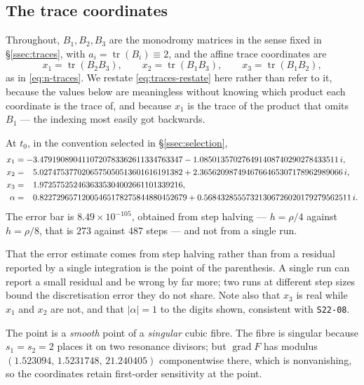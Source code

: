 \subsection{The trace coordinates}\label{ssec:traces-value}

Throughout, $B_1,B_2,B_3$ are the monodromy matrices in the sense fixed in
\S\ref{ssec:traces}, with $a_i=\operatorname{tr}(B_i)\equiv 2$, and the affine
trace coordinates are
\begin{equation}\label{eq:traces-restate}
x_1=\operatorname{tr}(B_2B_3),\qquad
x_2=\operatorname{tr}(B_1B_3),\qquad
x_3=\operatorname{tr}(B_1B_2),
\end{equation}
as in \eqref{eq:n-traces}. We restate \eqref{eq:traces-restate} here rather
than refer to it, because the values below are meaningless without knowing
which product each coordinate is the trace of, and because $x_1$ is the trace
of the product that omits $B_1$ --- the indexing most easily got backwards.

\begin{remark}
At $t_0$, in the convention selected in \S\ref{ssec:selection},
\begin{align*}
x_1&=-3.4791908904110720783362611334763347
 -1.085013570276491408740290278433511\,i,\\
x_2&=\hphantom{-}5.0274753770206575050513601616191382
 +2.3656209874946766465307178962989066\,i,\\
x_3&=\hphantom{-}1.9725752524636335304002661101339216,\\
\alpha&=\hphantom{-}0.82272965712005465178275844880452679
 +0.56843285557321306726020179279562511\,i.
\end{align*}
The error bar is $8.49\times10^{-105}$, obtained from step halving --- $h=\rho/4$
against $h=\rho/8$, that is $273$ against $487$ steps --- and not from a single
run.
\end{remark}

That the error estimate comes from step halving rather than from a residual
reported by a single integration is the point of the parenthesis. A single run
can report a small residual and be wrong by far more; two runs at different
step sizes bound the discretisation error they do not share. Note also that
$x_3$ is real while $x_1$ and $x_2$ are not, and that
$|\alpha|=1$ to the digits shown, consistent with \texttt{S22-08}.

\begin{remark}
The point is a \emph{smooth} point of a \emph{singular} cubic fibre. The fibre
is singular because $s_1=s_2=2$ places it on two resonance divisors; but
$\operatorname{grad}F$ has modulus $(1.523094,\,1.5231748,\,21.240405)$
componentwise there, which is nonvanishing, so the coordinates retain
first-order sensitivity at the point.
\end{remark}

